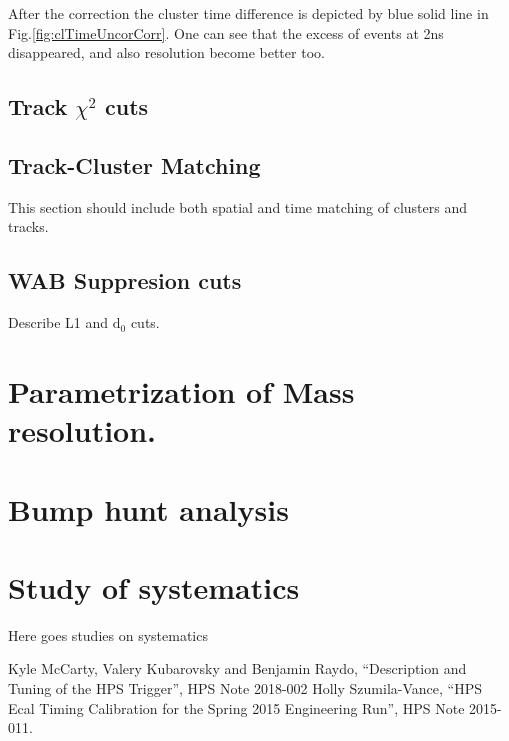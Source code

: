 \documentclass[letterpaper,12pt]{article}
\begin{document}
After the correction the cluster time difference is depicted by blue solid line in Fig.\ref{fig:clTimeUncorCorr}. One can see that the excess of events at 2ns disappeared, and also resolution become better too.

\subsection{Track $\chi^{2}$ cuts}
\subsection{Track-Cluster Matching}
This section should include both spatial and time matching of clusters and tracks.
\subsection{WAB Suppresion cuts}
Describe L1 and $\mathrm{d_{0}}$ cuts.

\section{Parametrization of Mass resolution.}

\section{Bump hunt analysis}


\section{Study of systematics}
Here goes studies on systematics

\begin{thebibliography}{55}
  Kyle McCarty, Valery Kubarovsky and Benjamin Raydo, ``Description and Tuning of the HPS Trigger'', HPS Note 2018-002
  Holly Szumila-Vance, ``HPS Ecal Timing Calibration for the
Spring 2015 Engineering Run'', HPS Note 2015-011.
\end{thebibliography}

 
\end{document}
